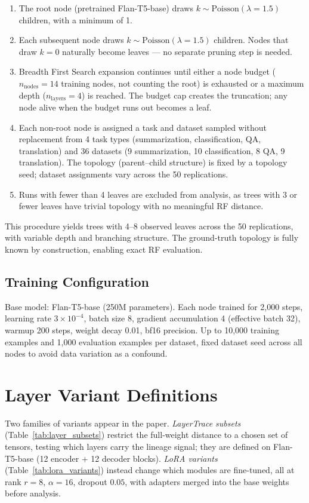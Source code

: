 \documentclass{article}
\theoremstyle{definition}
\theoremstyle{plain}
\begin{document}
\begin{enumerate}
    \item The root node (pretrained Flan-T5-base) draws $k \sim \mathrm{Poisson}(\lambda = 1.5)$ children, with a minimum of 1.
    \item Each subsequent node draws $k \sim \mathrm{Poisson}(\lambda = 1.5)$ children. Nodes that draw $k = 0$ naturally become leaves --- no separate pruning step is needed.
    \item Breadth First Search expansion continues until either a node budget ($n_\mathrm{nodes} = 14$ training nodes, not counting the root) is exhausted or a maximum depth ($n_\mathrm{layers} = 4$) is reached. The budget cap creates the truncation; any node alive when the budget runs out becomes a leaf.
    \item Each non-root node is assigned a task and dataset sampled without replacement from 4 task types (summarization, classification, QA, translation) and 36 datasets (9 summarization, 10 classification, 8 QA, 9 translation). The topology (parent--child structure) is fixed by a topology seed; dataset assignments vary across the 50 replications.
    \item Runs with fewer than 4 leaves are excluded from analysis, as trees with 3 or fewer leaves have trivial topology with no meaningful RF distance.
\end{enumerate}

This procedure yields trees with 4--8 observed leaves across the 50 replications, with variable depth and branching structure. The ground-truth topology is fully known by construction, enabling exact RF evaluation.

\subsection*{Training Configuration}
Base model: Flan-T5-base (250M parameters). Each node trained for 2,000 steps, learning rate $3 \times 10^{-4}$, batch size 8, gradient accumulation 4 (effective batch 32), warmup 200 steps, weight decay 0.01, bf16 precision. Up to 10,000 training examples and 1,000 evaluation examples per dataset, fixed dataset seed across all nodes to avoid data variation as a confound.

\section{Layer Variant Definitions}
\label{app:layers}
Two families of variants appear in the paper. \emph{LayerTrace subsets} (Table~\ref{tab:layer_subsets})
restrict the full-weight distance to a chosen set of tensors, testing which layers carry the lineage
signal; they are defined on Flan-T5-base (12 encoder + 12 decoder blocks). \emph{LoRA variants}
(Table~\ref{tab:lora_variants}) instead change which modules are fine-tuned, all at rank $r=8$,
$\alpha=16$, dropout $0.05$, with adapters merged into the base weights before analysis.
\end{document}
